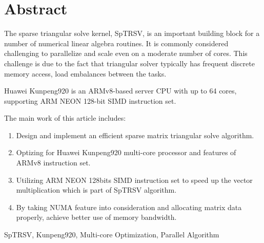 ﻿\renewcommand{\baselinestretch}{1.5}
\fontsize{12pt}{13pt}\selectfont

\chapter[ABSTRACT(英文摘要)]{Abstract}

The sparse triangular solve kernel, SpTRSV, is an important building block for a number of numerical linear algebra routines. It is commonly considered challenging to parallelize and scale even on a moderate number of cores. This challenge is due to the fact that triangular solver typically has frequent discrete memory access, load embalances between the tasks.

Huawei Kunpeng920 is an ARMv8-based server CPU with up to 64 cores, supporting ARM NEON 128-bit SIMD instruction set.

\noindent
The main work of this article includes:
\vspace{-12pt}
\begin{enumerate} \setlength{\itemsep}{0pt}
    \item Design and implement an efficient sparse matrix triangular solve algorithm.
    \item Optizing for Huawei Kunpeng920 multi-core processor and features of ARMv8 instruction set.
    \item Utilizing ARM NEON 128bits SIMD instruction set to speed up the vector multiplication which is part of SpTRSV algorithm.
    \item By taking NUMA feature into consideration and allocating matrix data properly, achieve better use of memory bandwidth.
\end{enumerate}
\vspace{-12pt}


\vspace{1em}
 \quad SpTRSV, Kunpeng920, Multi-core Optimization, Parallel Algorithm

\clearpage
\endinput